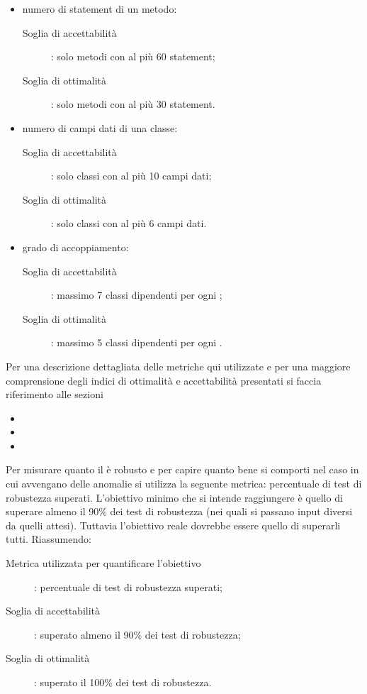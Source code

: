 					\begin{itemize}
						\item numero di statement di un metodo:
						\begin{description}
							\item[Soglia di accettabilità]: solo metodi con al più 60 statement;
							\item[Soglia di ottimalità]: solo metodi con al più 30 statement.
						\end{description}
						\item numero di campi dati di una classe:
						\begin{description}
							\item[Soglia di accettabilità]: solo classi con al più 10 campi dati;
							\item[Soglia di ottimalità]: solo classi con al più 6 campi dati.
						\end{description}
						\item grado di accoppiamento:
						\begin{description}
							\item[Soglia di accettabilità]: massimo 7 classi dipendenti per ogni ;
							\item[Soglia di ottimalità]: massimo 5 classi dipendenti per ogni .
						\end{description}
					\end{itemize}
					Per una descrizione dettagliata delle metriche qui utilizzate e per una maggiore comprensione degli indici di ottimalità e accettabilità presentati si faccia riferimento alle sezioni
					\begin{itemize}
						\item {}
						\item {}
						\item {}
					\end{itemize}			
					Per misurare quanto il  è robusto e per capire quanto bene si comporti nel caso in cui avvengano delle anomalie si utilizza la seguente metrica: percentuale di test di robustezza superati. L'obiettivo minimo che si intende raggiungere è quello di superare almeno il 90\% dei test di robustezza (nei quali si passano input diversi da quelli attesi). Tuttavia l'obiettivo reale dovrebbe essere quello di superarli tutti. Riassumendo:
					\begin{description}
						\item[Metrica utilizzata per quantificare l'obiettivo]: percentuale di test di robustezza superati;
						\item[Soglia di accettabilità]: superato almeno il 90\% dei test di robustezza;
						\item[Soglia di ottimalità]: superato il 100\% dei test di robustezza.
					\end{description}

